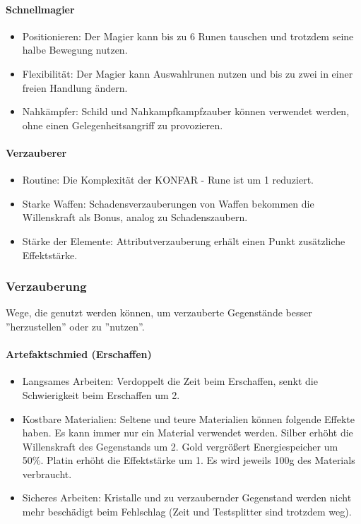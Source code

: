 \documentclass{article}
\begin{document}
\paragraph{Schnellmagier}

\begin{itemize}
\item Positionieren: Der Magier kann bis zu 6 Runen tauschen und trotzdem seine halbe Bewegung nutzen.
\item Flexibilität: Der Magier kann Auswahlrunen nutzen und bis zu zwei in einer freien Handlung ändern.
\item Nahkämpfer: Schild und Nahkampfkampfzauber können verwendet werden, ohne einen Gelegenheitsangriff zu provozieren.
\end{itemize}

\paragraph{Verzauberer}

\begin{itemize}
\item Routine: Die Komplexität der KONFAR - Rune ist um 1 reduziert.
\item Starke Waffen: Schadensverzauberungen von Waffen bekommen die Willenskraft als Bonus, analog zu Schadenszaubern.
\item Stärke der Elemente: Attributverzauberung erhält einen Punkt zusätzliche Effektstärke.
\end{itemize}

\subsubsection{Verzauberung}

Wege, die genutzt werden können, um verzauberte Gegenstände besser ''herzustellen'' oder zu ''nutzen''.

\paragraph{Artefaktschmied (Erschaffen)}

\begin{itemize}
\item Langsames Arbeiten: Verdoppelt die Zeit beim Erschaffen, senkt die Schwierigkeit beim Erschaffen um 2.
\item Kostbare Materialien: Seltene und teure Materialien können folgende Effekte haben. Es kann immer nur ein Material verwendet werden. Silber erhöht die Willenskraft des Gegenstands um 2. Gold vergrößert Energiespeicher um 50\%. Platin erhöht die Effektstärke um 1. Es wird jeweils 100g des Materials verbraucht.
\item Sicheres Arbeiten: Kristalle und zu verzaubernder Gegenstand werden nicht mehr beschädigt beim Fehlschlag (Zeit und Testsplitter sind trotzdem weg).
\end{itemize}
\end{document}

